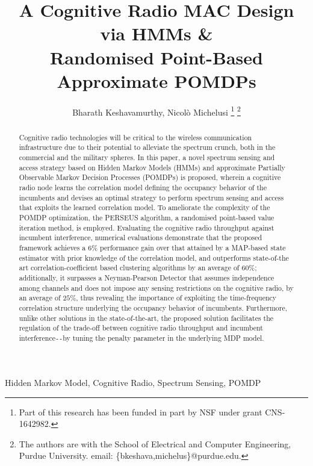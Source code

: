 \documentclass[10pt,twocolumn]{IEEEtran}
\title{A Cognitive Radio MAC Design via HMMs \&
\\
Randomised Point-Based Approximate POMDPs}
\author{Bharath Keshavamurthy, Nicol\`{o} Michelusi
\thanks{Part of this research has been funded in part by NSF under grant CNS-1642982.}
\thanks{The authors are with the School of Electrical and Computer Engineering, Purdue University. email: \{bkeshava,michelus\}@purdue.edu.}
\vspace{-12mm}}
\begin{document}
\maketitle
\thispagestyle{empty}
\pagestyle{empty} 
\begin{abstract}
Cognitive radio technologies will be critical to the wireless communication infrastructure due to their potential to alleviate the spectrum crunch, both in the commercial and the military spheres. In this paper, a novel spectrum sensing and access strategy based on Hidden Markov Models (HMMs) and approximate Partially Observable Markov Decision Processes (POMDPs) is proposed, wherein a cognitive radio node learns the correlation model defining the occupancy behavior of the incumbents and devises an optimal strategy to perform spectrum sensing and access that exploits the learned correlation model. To ameliorate the complexity of the POMDP optimization, the PERSEUS algorithm, a randomised point-based value iteration method, is employed. Evaluating the cognitive radio throughput against incumbent interference, numerical evaluations demonstrate that the proposed framework achieves a $6$\% performance gain over that attained by a MAP-based state estimator with prior knowledge of the correlation model, and outperforms state-of-the art correlation-coefficient based clustering algorithms by an average of $60$\%; additionally, it surpasses a Neyman-Pearson Detector that assumes independence among channels and does not impose any sensing restrictions on the cognitive radio, by an average of $25$\%, thus revealing the importance of exploiting the time-frequency correlation structure underlying the occupancy behavior of incumbents. Furthermore, unlike other solutions in the state-of-the-art, the proposed solution facilitates the regulation of the trade-off between cognitive radio throughput and incumbent interference\texttt{-{}-}by tuning the penalty parameter in the underlying MDP model.
\end{abstract}
\begin{IEEEkeywords}
Hidden Markov Model, Cognitive Radio, Spectrum Sensing, POMDP
\end{IEEEkeywords}
\end{document}
